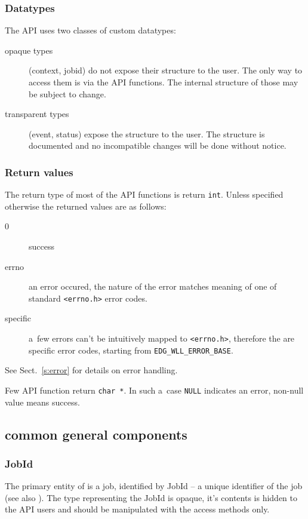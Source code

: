 \subsubsection{Datatypes}
The API uses two classes of custom datatypes:
\begin{description}
\item[opaque types] (\eg context, jobid) do not expose their structure
to the user.
The only way to access them is via the API functions.
The internal structure of those may be subject to change.

\item[transparent types] (\eg event, status) expose the structure to the
user. The structure is documented and no incompatible changes will be done
without notice.
\end{description}

\subsubsection{Return values}
The return type of most of the API functions is return \verb'int'.
Unless specified otherwise the returned values are as follows:
\begin{description}
\item[0] success
\item[errno] an error occured, the nature of the error
matches meaning of one of standard \verb'<errno.h>' error codes.
\item[\LB specific] a~few errors can't be intuitively mapped to
\verb'<errno.h>', therefore the are specific \LB error codes, starting from \verb'EDG_WLL_ERROR_BASE'.
\end{description}
See Sect.~\ref{s:error} for details on error handling.

Few API function return \verb'char *'. In such a~case \verb'NULL' indicates
an error, non-null value means success.

\subsection{\LB common general components}

\subsubsection{JobId} 
The primary entity of \LB is a job, identified by JobId -- a unique
identifier of the job (see also \cite{LBUG}). The type representing
the JobId is opaque, it's contents is hidden to the API users and
should be manipulated with the access methods only.

